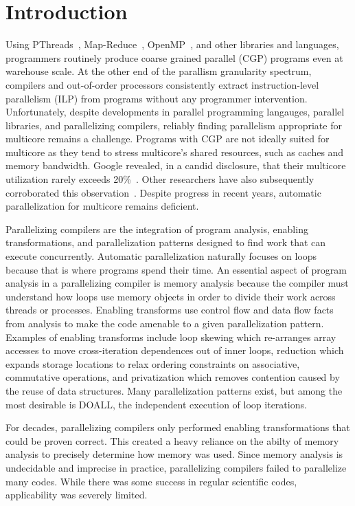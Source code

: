 \section{Introduction}

Using PThreads~\cite{pthread:web}, Map-Reduce~\cite{dean:08:cacm},
OpenMP~\cite{openmp:web}, and other libraries and languages,
programmers routinely produce coarse grained parallel (CGP) programs
even at warehouse scale.  At the other end of the parallism
granularity spectrum, compilers and out-of-order processors
consistently extract instruction-level parallelism (ILP) from programs
without any programmer intervention.  Unfortunately, despite
developments in parallel programming langauges, parallel libraries,
and parallelizing compilers, reliably finding parallelism appropriate
for multicore remains a challenge.  Programs with CGP are not ideally
suited for multicore as they tend to stress multicore's shared
resources, such as caches and memory bandwidth.  Google revealed, in a
candid disclosure, that their multicore utilization rarely exceeds
20\%~\cite{barroso:07:computer}. Other researchers have also
subsequently corroborated this observation~\cite{chung:13:isca}.
Despite progress in recent years, automatic parallelization for
multicore remains deficient.

Parallelizing compilers are the integration of program analysis,
enabling transformations, and parallelization patterns designed to
find work that can execute concurrently.  Automatic parallelization
naturally focuses on loops because that is where programs spend their
time.  An essential aspect of program analysis in a parallelizing
compiler is memory analysis because the compiler must understand how
loops use memory objects in order to divide their work across threads
or processes.  Enabling transforms use control flow and data flow
facts from analysis to make the code amenable to a given
parallelization pattern.  Examples of enabling transforms include loop
skewing which re-arranges array accesses to move cross-iteration
dependences out of inner loops, reduction which expands storage
locations to relax ordering constraints on associative, commutative
operations, and privatization which removes contention caused by the
reuse of data structures.  Many parallelization patterns exist, but
among the most desirable is DOALL, the independent execution of loop
iterations.

For decades, parallelizing compilers only performed enabling
transformations that could be proven correct.  This created a heavy
reliance on the abilty of memory analysis to precisely determine how
memory was used.  Since memory analysis is undecidable and imprecise
in practice, parallelizing compilers failed to parallelize many codes.
While there was some success in regular scientific codes,
applicability was severely limited.

